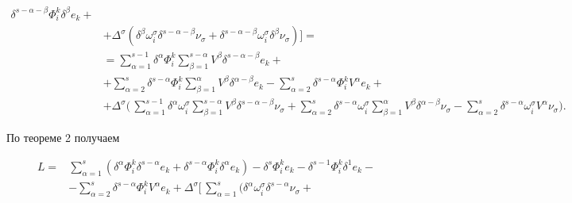 \begin{pf}
\begin{align*}
\delta^{s-\alpha-\beta}\Phi^k_i\delta^{\beta} e_k+\\


&+\Delta^{\sigma}(\delta^{\beta}\omega^{\sigma}_i


\delta^{s-\alpha-\beta}\nu_{\sigma}+


\delta^{s-\alpha-\beta}\omega^{\sigma}_i


\delta^{\beta}\nu_{\sigma})]=\\


&=\sum_{\alpha=1}^{s-1}\delta^{\alpha}\Phi^k_i


\sum_{\beta=1}^{s-\alpha}V^{\beta}\delta^{s-\alpha-\beta}e_k+\\


&+\sum_{\alpha=2}^{s}\delta^{s-\alpha}\Phi^k_i


\sum_{\beta=1}^{\alpha}V^{\beta}\delta^{\alpha-\beta}e_k-


\sum_{\alpha=2}^{s}\delta^{s-\alpha}\Phi^k_iV^{\alpha}e_k+\\


&+\Delta^{\sigma}\biggl(\,\sum_{\alpha=1}^{s-1}\delta^{\alpha}


\omega^{\sigma}_i\sum_{\beta=1}^{s-\alpha}V^{\beta}


\delta^{s-\alpha-\beta}\nu_{\sigma}+


\sum_{\alpha=2}^{s}\delta^{s-\alpha}\omega^{\sigma}_i


\sum_{\beta=1}^{\alpha}V^{\beta}\delta^{\alpha-\beta}


\nu_{\sigma}-


\sum_{\alpha=2}^{s}\delta^{s-\alpha}\omega^{\sigma}_i


V^{\alpha}\nu_{\sigma}\biggr).


\end{align*}


По теореме 2 получаем


\begin{align*}


L=&\sum_{\alpha=1}^{s}(\delta^{\alpha}\Phi^k_i\delta^{s-\alpha}e_k+


\delta^{s-\alpha}\Phi^k_i\delta^{\alpha}e_k)-\delta^s\Phi^k_ie_k-


\delta^{s-1}\Phi^k_i\delta^1e_k-\\


&-\sum_{\alpha=2}^{s}\delta^{s-\alpha}\Phi^k_iV^{\alpha}e_k+


\Delta^{\sigma}\biggr[\,\sum_{\alpha=1}^{s}(\delta^{\alpha}


\omega^{\sigma}_i\delta^{s-\alpha}\nu_{\sigma}+



\end{align*}
\end{pf}
